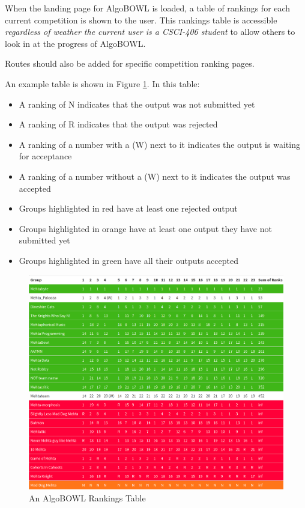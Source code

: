 \documentclass[12pt]{article}
\begin{document}
When the landing page for AlgoBOWL is loaded, a table of rankings for each
current competition is shown to the user. This rankings table is accessible
\emph{regardless of weather the current user is a CSCI-406 student} to allow
others to look in at the progress of AlgoBOWL.

Routes should also be added for specific competition ranking pages.

An example table is shown in Figure \ref{algotbl}. In this table:
\begin{itemize}
    \item A ranking of \textsf{N} indicates that the output was not submitted yet
    \item A ranking of \textsf{R} indicates that the output was rejected
    \item A ranking of a number with a \textsf{(W)} next to it indicates the output is waiting for acceptance
    \item A ranking of a number without a \textsf{(W)} next to it indicates the output was accepted
    \item Groups highlighted in red have at least one rejected output
    \item Groups highlighted in orange have at least one output they have not submitted yet
    \item Groups highlighted in green have all their outputs accepted
\end{itemize}

\begin{figure}
    \includegraphics[width=\textwidth]{graphics/algotbl}
    \caption{An AlgoBOWL Rankings Table}
    \label{algotbl}
\end{figure}
\end{document}
